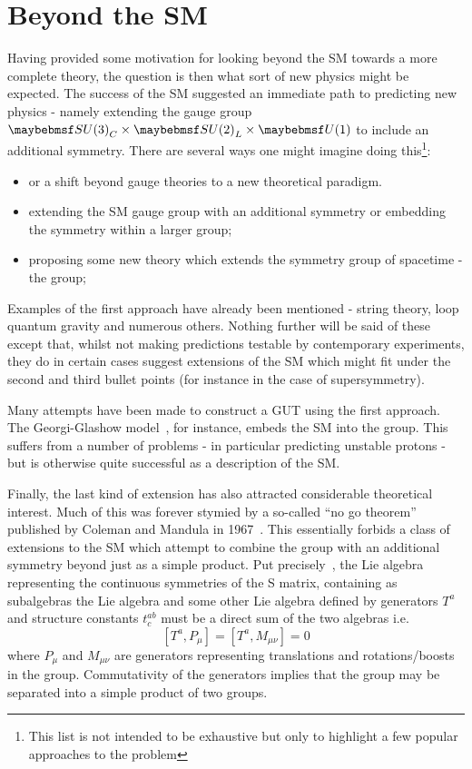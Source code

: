 \section{Beyond the \acl{SM}}
Having provided some motivation for looking beyond the \ac{SM} towards a more
complete theory, the question is then what sort of new physics might be
expected. The success of the \ac{SM} suggested an immediate path to predicting
new physics - namely extending the gauge group
$\SUthree_C\times\SUtwo_L\times\Uone$ to include an additional symmetry. There
are several ways one might imagine doing this\footnote{This list is not intended
  to be exhaustive but only to highlight a few popular approaches to the problem}:
\begin{itemize}
\item or a shift beyond gauge theories to a new theoretical paradigm.
\item extending the \ac{SM} gauge group with an additional symmetry or embedding
  the symmetry within a larger group;
\item proposing some new theory which extends the symmetry group of spacetime -
  the \Poincare group;
\end{itemize}

Examples of the first approach have already been mentioned - string theory, loop
quantum gravity and numerous others. Nothing further will be said of these
except that, whilst not making predictions testable by contemporary experiments,
they do in certain cases suggest extensions of the \ac{SM} which might fit under
the second and third bullet points (for instance in the case of supersymmetry).

Many attempts have been made to construct a \acl{GUT} using the first
approach. The Georgi-Glashow model~\cite{georgi_glashow}, for instance, embeds
the \ac{SM} into the \SUfive group. This suffers from a number of problems - in
particular predicting unstable protons - but is otherwise quite successful as a
description of the \ac{SM}.

Finally, the last kind of extension has also attracted considerable theoretical
interest. Much of this was forever stymied by a so-called ``no go theorem''
published by Coleman and Mandula in 1967~\cite{coleman_mandula}. This
essentially forbids a class of extensions to the \ac{SM} which attempt to
combine the \Poincare group with an additional symmetry beyond just as a simple
product. Put precisely~\cite{sparticles}, the Lie algebra representing the
continuous symmetries of the S matrix, containing as subalgebras the \Poincare
Lie algebra and some other Lie algebra defined by generators $T^a$ and structure
constants $t^{ab}_c$ must be a direct sum of the two algebras i.e.
\begin{equation}
\left[T^a, P_{\mu}\right] = \left[T^a, M_{\mu\nu}\right] = 0
\end{equation}
where $P_{\mu}$ and $M_{\mu\nu}$ are generators representing translations and
rotations/boosts in the \Poincare group. Commutativity of the generators implies
that the group may be separated into a simple product of two groups.

